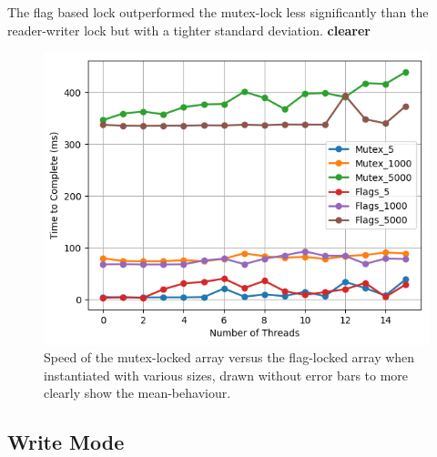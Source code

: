 \documentclass[11pt]{article}
\newcommand{\todo}[1]{\textbf{#1}}
\begin{document}
The flag based lock outperformed the mutex-lock less significantly than the reader-writer lock but with a tighter standard deviation. \todo{clearer}

\begin{figure}\label{fig:step6_2}
\centering
\includegraphics[scale=0.65]{step6_2.png}
\caption{Speed of the mutex-locked array versus the flag-locked array when instantiated with various sizes, drawn without error bars to more clearly show the mean-behaviour.}
\end{figure}

\subsection{Write Mode}
\end{document}
